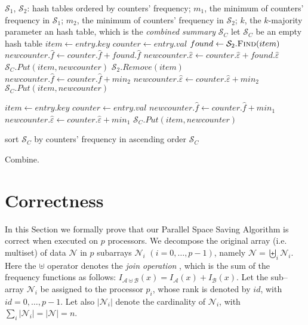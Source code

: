 \documentclass[final,3p,times]{elsarticle}
\begin{document}
\begin{algorithm}
\begin{algorithmic}[1]
\Require $\mathcal{S}_1$, $\mathcal{S}_2$: hash tables ordered by counters' frequency; $m_1$, the minimum of counters' frequency in $\mathcal{S}_1$; $m_2$, the minimum of counters' frequency in $\mathcal{S}_2$; $k$, the $k$-majority parameter
\Ensure an hash table, which is the \textit{combined summary} $\mathcal{S}_C$
\State let $\mathcal{S}_C$ be an empty hash table
	\State $item \leftarrow entry.key$
	\State $counter \leftarrow entry.val$	
	\State $found \leftarrow \mathcal{S}_2.\Call{Find}{item}$
		\State $newcounter.\hat{f} \leftarrow counter.\hat{f} + found.\hat{f}$
		\State $newcounter.\hat{\varepsilon} \leftarrow counter.\hat{\varepsilon} + found.\hat{\varepsilon}$
		\State $\mathcal{S}_C.Put(item, newcounter)$
		\State $\mathcal{S}_2.Remove(item)$
	\Else
		\State $newcounter.\hat{f} \leftarrow counter.\hat{f} + min_2$
		\State $newcounter.\hat{\varepsilon} \leftarrow counter.\hat{\varepsilon} + min_2$
		\State $\mathcal{S}_C.Put(item, newcounter)$
	\EndIf
\EndFor

	\State $item \leftarrow entry.key$
	\State $counter \leftarrow entry.val$	
	\State $newcounter.\hat{f} \leftarrow counter.\hat{f} + min_1$
	\State $newcounter.\hat{\varepsilon} \leftarrow counter.\hat{\varepsilon} + min_1$
	\State $\mathcal{S}_C.Put(item, newcounter)$
\EndFor

\State sort $\mathcal{S}_C$ by counters' frequency in ascending order
\State \Return $\mathcal{S}_C$
\EndProcedure
\caption{Combine.}
\label{combine}
\end{algorithmic}
\end{algorithm}



\section{Correctness}
\label{correctness}

In this Section we formally prove that our Parallel Space Saving Algorithm is correct when executed on $p$ processors. We decompose the original array (i.e. multiset) of data $\mathcal{N}$ in $p$ subarrays $\mathcal{N}_i$ $(i=0,\ldots,p-1)$, namely $\mathcal{N}=\biguplus_i \mathcal{N}_i$. Here
the $\uplus$ operator denotes the \textit{join operation} \cite{Syropoulos01}, which is the sum of the frequency functions as follows:
$I_{\mathcal{A} \uplus \mathcal{B}} (x) = I_\mathcal{A} (x) + I_\mathcal{B} (x)$.
Let the sub--array $\mathcal{N}_i$ be assigned to the processor $p_i$, whose rank is denoted by $id$, with $id=0,\ldots, p-1$. Let also $\left\vert{\mathcal{N}_i}\right\vert$ denote the cardinality of $\mathcal{N}_i$, with $\sum_i \left\vert{\mathcal{N}_i}\right\vert=\left\vert{\mathcal{N}}\right\vert=n $.
\end{document}
